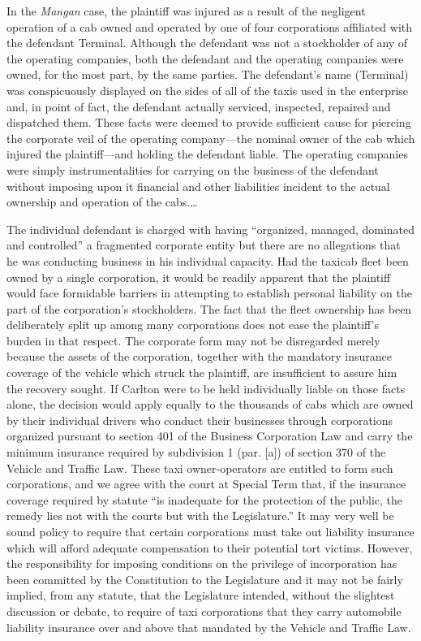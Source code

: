 In the \textit{Mangan} case, the plaintiff was injured as a result of the
negligent operation of a cab owned and operated by one of four corporations
affiliated with the defendant Terminal. Although the defendant was not a
stockholder of any of the operating companies, both the defendant and the
operating companies were owned, for the most part, by the same parties. The
defendant's name (Terminal) was conspicuously displayed on the sides of all of
the taxis used in the enterprise and, in point of fact, the defendant actually
serviced, inspected, repaired and dispatched them. These facts were deemed to
provide sufficient cause for piercing the corporate veil of the operating
company---the nominal owner of the cab which injured the plaintiff---and
holding the defendant liable. The operating companies were simply
instrumentalities for carrying on the business of the defendant without imposing
upon it financial and other liabilities incident to the actual ownership and
operation of the cabs.\ldots 

The individual defendant is charged with having ``organized, managed, dominated
and controlled'' a fragmented corporate entity but there are no allegations that
he was conducting business in his individual capacity. Had the taxicab fleet
been owned by a single corporation, it would be readily apparent that the
plaintiff would face formidable barriers in attempting to establish personal
liability on the part of the corporation's stockholders. The fact that the fleet
ownership has been deliberately split up among many corporations does not ease
the plaintiff's burden in that respect. The corporate form may not be
disregarded merely because the assets of the corporation, together with the
mandatory insurance coverage of the vehicle which struck the plaintiff, are
insufficient to assure him the recovery sought. If Carlton were to be held
individually liable on those facts alone, the decision would apply equally to
the thousands of cabs which are owned by their individual drivers who conduct
their businesses through corporations organized pursuant to section 401 of the
Business Corporation Law and carry the minimum insurance required by subdivision
1 (par. [a]) of section 370 of the Vehicle and Traffic Law. These taxi
owner-operators are entitled to form such corporations, and we agree with the
court at Special Term that, if the insurance coverage required by statute ``is
inadequate for the protection of the public, the remedy lies not with the courts
but with the Legislature.'' It may very well be sound policy to require that
certain corporations must take out liability insurance which will afford
adequate compensation to their potential tort victims. However, the
responsibility for imposing conditions on the privilege of incorporation has
been committed by the Constitution to the Legislature and it may not be fairly
implied, from any statute, that the Legislature intended, without the slightest
discussion or debate, to require of taxi corporations that they carry automobile
liability insurance over and above that mandated by the Vehicle and Traffic Law.

